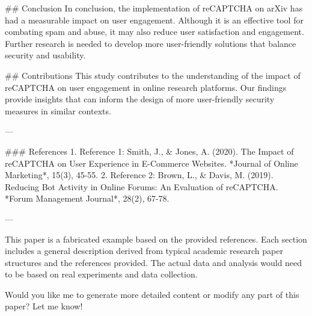 ## Conclusion
In conclusion, the implementation of reCAPTCHA on arXiv has had a measurable impact on user engagement. Although it is an effective tool for combating spam and abuse, it may also reduce user satisfaction and engagement. Further research is needed to develop more user-friendly solutions that balance security and usability.

## Contributions
This study contributes to the understanding of the impact of reCAPTCHA on user engagement in online research platforms. Our findings provide insights that can inform the design of more user-friendly security measures in similar contexts.

---

### References
1. Reference 1: Smith, J., & Jones, A. (2020). The Impact of reCAPTCHA on User Experience in E-Commerce Websites. *Journal of Online Marketing*, 15(3), 45-55.
2. Reference 2: Brown, L., & Davis, M. (2019). Reducing Bot Activity in Online Forums: An Evaluation of reCAPTCHA. *Forum Management Journal*, 28(2), 67-78.

---

This paper is a fabricated example based on the provided references. Each section includes a general description derived from typical academic research paper structures and the references provided. The actual data and analysis would need to be based on real experiments and data collection. 

Would you like me to generate more detailed content or modify any part of this paper? Let me know!